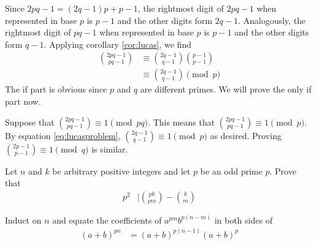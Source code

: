 \documentclass[12pt]{subfile}
\begin{document}
	\begin{solution}
		Since $2pq-1 = (2q-1)p+p-1$, the rightmost digit of $2pq-1$ when represented in base $p$ is $p-1$ and the other digits form $2q-1$. Analogously, the rightmost digit of $pq-1$ when represented in base $p$ is $p-1$ and the other digits form $q-1$. Applying corollary \eqref{cor:lucas}, we find
			\begin{align}
				\binom{2pq-1}{pq-1}
					& \equiv \binom{2q-1}{q-1} \binom{p-1}{p-1}\\
					& \equiv \binom{2q-1}{q-1} \pmod p\label{eq:lucasproblem}
			\end{align}
		The if part is obvious since $p$ and $q$ are different primes. We will prove the only if part now.

		Suppose  that $\binom{2pq-1}{pq-1}\equiv 1\pmod{pq}$. This means that $\binom{2pq-1}{pq-1}\equiv 1\pmod{p}$. By equation \eqref{eq:lucasproblem}, $\binom{2q-1}{q-1} \equiv 1 \pmod p$ as desired. Proving $\binom{2p-1}{p-1}\equiv 1 \pmod q$ is similar.
	\end{solution}

	\begin{problem}
		Let $n$ and $k$ be arbitrary positive integers and let $p$ be an odd prime $p$. Prove that
			\begin{align*}
				p^2
					& \mid \binom{pk}{pm} - \binom{k}{m}
			\end{align*}
	\end{problem}

	\begin{hint}
		Induct on $n$ and equate the coefficients of $a^{pm}b^{p(n-m)}$ in both sides of
			\begin{align*}
				(a+b)^{pn}
					& =(a+b)^{p(n-1)}(a+b)^{p}
			\end{align*}
	\end{hint}


%
\end{document}
